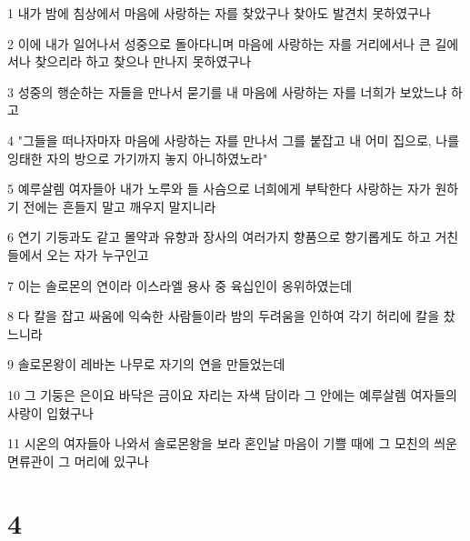 \par 1 내가 밤에 침상에서 마음에 사랑하는 자를 찾았구나 찾아도 발견치 못하였구나
\par 2 이에 내가 일어나서 성중으로 돌아다니며 마음에 사랑하는 자를 거리에서나 큰 길에서나 찾으리라 하고 찾으나 만나지 못하였구나
\par 3 성중의 행순하는 자들을 만나서 묻기를 내 마음에 사랑하는 자를 너희가 보았느냐 하고
\par 4 "그들을 떠나자마자 마음에 사랑하는 자를 만나서 그를 붙잡고 내 어미 집으로, 나를 잉태한 자의 방으로 가기까지 놓지 아니하였노라"
\par 5 예루살렘 여자들아 내가 노루와 들 사슴으로 너희에게 부탁한다 사랑하는 자가 원하기 전에는 흔들지 말고 깨우지 말지니라
\par 6 연기 기둥과도 같고 몰약과 유향과 장사의 여러가지 향품으로 향기롭게도 하고 거친 들에서 오는 자가 누구인고
\par 7 이는 솔로몬의 연이라 이스라엘 용사 중 육십인이 옹위하였는데
\par 8 다 칼을 잡고 싸움에 익숙한 사람들이라 밤의 두려움을 인하여 각기 허리에 칼을 찼느니라
\par 9 솔로몬왕이 레바논 나무로 자기의 연을 만들었는데
\par 10 그 기둥은 은이요 바닥은 금이요 자리는 자색 담이라 그 안에는 예루살렘 여자들의 사랑이 입혔구나
\par 11 시온의 여자들아 나와서 솔로몬왕을 보라 혼인날 마음이 기쁠 때에 그 모친의 씌운 면류관이 그 머리에 있구나

\chapter{4}

